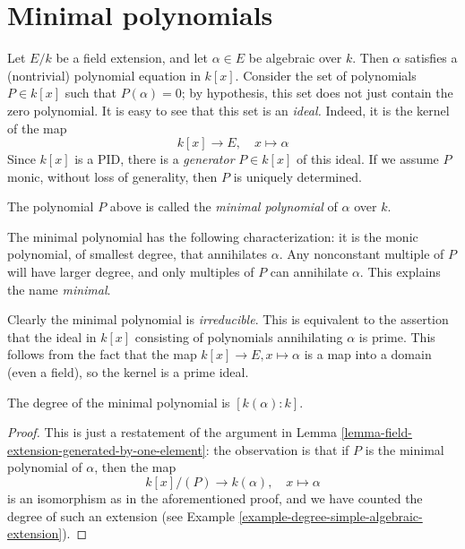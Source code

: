 \section{Minimal polynomials}
\label{section-minimal-polynomials}

\noindent
Let $E/k$ be a field extension, and let $\alpha \in E$ be algebraic over $k$.
Then $\alpha$ satisfies a (nontrivial) polynomial equation in $k[x]$.
Consider the set of polynomials $P \in k[x]$ such that $P(\alpha) = 0$; by
hypothesis, this set does not just contain the zero polynomial.
It is easy to see that this set is an {\it ideal.} Indeed, it is the kernel
of the map
$$
k[x] \to E, \quad x \mapsto \alpha
$$
Since $k[x]$ is a PID, there is a {\it generator} $P \in k[x]$ of this
ideal. If we assume $P$ monic, without loss of generality, then $P$ is
uniquely determined.

\begin{definition}
\label{definition-minimal-polynomial}
The polynomial $P$ above is called the {\it minimal polynomial}
of $\alpha$ over $k$.
\end{definition}

\noindent
The minimal polynomial has the following characterization: it is the monic
polynomial, of smallest degree, that annihilates $\alpha$. Any nonconstant
multiple of $P$ will have larger degree, and only multiples of $P$ can
annihilate $\alpha$. This explains the name {\it minimal}.

\medskip\noindent
Clearly the minimal polynomial is {\it irreducible}. This is equivalent to the
assertion that the ideal in $k[x]$ consisting of polynomials annihilating
$\alpha$ is prime. This follows from the fact that the map
$k[x] \to E, x \mapsto \alpha$ is a map into a domain (even a field), so the
kernel is a prime ideal.

\begin{lemma}
\label{lemma-degree-minimal-polynomial}
The degree of the minimal polynomial is $[k(\alpha) : k]$.
\end{lemma}

\begin{proof}
This is just a restatement of the argument in
Lemma \ref{lemma-field-extension-generated-by-one-element}: the observation
is that if $P$ is the minimal polynomial of $\alpha$, then the map
$$
k[x]/(P) \to k(\alpha), \quad x \mapsto \alpha
$$
is an isomorphism as in the aforementioned proof, and we have counted the
degree of such an extension (see
Example \ref{example-degree-simple-algebraic-extension}).
\end{proof}

